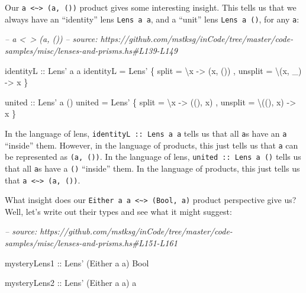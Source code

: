 \documentclass[]{article}
\newenvironment{Shaded}{}{}
\newcommand{\CommentTok}[1]{\textcolor[rgb]{0.38,0.63,0.69}{\textit{#1}}}
\newcommand{\DataTypeTok}[1]{\textcolor[rgb]{0.56,0.13,0.00}{#1}}
\newcommand{\FunctionTok}[1]{\textcolor[rgb]{0.02,0.16,0.49}{#1}}
\newcommand{\NormalTok}[1]{#1}
\newcommand{\OtherTok}[1]{\textcolor[rgb]{0.00,0.44,0.13}{#1}}
\begin{document}
Our \texttt{a\ \textless{}\textasciitilde{}\textgreater{}\ (a,\ ())} product
gives some interesting insight. This tells us that we always have an
``identity'' lens \texttt{Lens\textquotesingle{}\ a\ a}, and a ``unit'' lens
\texttt{Lens\textquotesingle{}\ a\ ()}, for any \texttt{a}:

\begin{Shaded}
\begin{Highlighting}[]
\CommentTok{-- a <~> (a, ())}
\CommentTok{-- source: https://github.com/mstksg/inCode/tree/master/code-samples/misc/lenses-and-prisms.hs#L139-L149}

\OtherTok{identityL ::} \DataTypeTok{Lens'}\NormalTok{ a a}
\NormalTok{identityL }\FunctionTok{=} \DataTypeTok{Lens'}
\NormalTok{    \{ split   }\FunctionTok{=}\NormalTok{ \textbackslash{}x      }\OtherTok{->}\NormalTok{ (x, ())}
\NormalTok{    , unsplit }\FunctionTok{=}\NormalTok{ \textbackslash{}(x, _) }\OtherTok{->}\NormalTok{ x}
\NormalTok{    \}}

\OtherTok{united ::} \DataTypeTok{Lens'}\NormalTok{ a ()}
\NormalTok{united }\FunctionTok{=} \DataTypeTok{Lens'}
\NormalTok{    \{ split   }\FunctionTok{=}\NormalTok{ \textbackslash{}x       }\OtherTok{->}\NormalTok{ ((), x)}
\NormalTok{    , unsplit }\FunctionTok{=}\NormalTok{ \textbackslash{}((), x) }\OtherTok{->}\NormalTok{ x}
\NormalTok{    \}}
\end{Highlighting}
\end{Shaded}

In the language of lens, \texttt{identityL\ ::\ Lens\textquotesingle{}\ a\ a}
tells us that all \texttt{a}s have an \texttt{a} ``inside'' them. However, in
the language of products, this just tells us that \texttt{a} can be represented
as \texttt{(a,\ ())}. In the language of lens,
\texttt{united\ ::\ Lens\textquotesingle{}\ a\ ()} tells us that all \texttt{a}s
have a \texttt{()} ``inside'' them. In the language of products, this just tells
us that \texttt{a\ \textless{}\textasciitilde{}\textgreater{}\ (a,\ ())}.

What insight does our
\texttt{Either\ a\ a\ \textless{}\textasciitilde{}\textgreater{}\ (Bool,\ a)}
product perspective give us? Well, let's write out their types and see what it
might suggest:

\begin{Shaded}
\begin{Highlighting}[]
\CommentTok{-- source: https://github.com/mstksg/inCode/tree/master/code-samples/misc/lenses-and-prisms.hs#L151-L161}

\OtherTok{mysteryLens1 ::} \DataTypeTok{Lens'}\NormalTok{ (}\DataTypeTok{Either}\NormalTok{ a a) }\DataTypeTok{Bool}

\OtherTok{mysteryLens2 ::} \DataTypeTok{Lens'}\NormalTok{ (}\DataTypeTok{Either}\NormalTok{ a a) a}
\end{Highlighting}
\end{Shaded}
\end{document}
